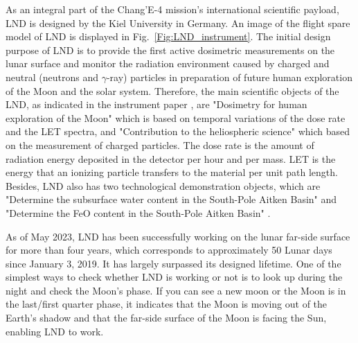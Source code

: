 As an integral part of the Chang'E-4 mission's international scientific payload, \acl{LND} is designed by the Kiel University in Germany. An image of the flight spare model of \ac{LND} is displayed in Fig.~\ref{Fig:LND_instrument}. 
The initial design purpose of \ac{LND} is to provide the first active 
dosimetric measurements on the lunar surface and monitor the radiation environment caused by charged and neutral (neutrons and $\gamma$-ray) particles in preparation of future human exploration of the Moon and the solar system. Therefore, the main scientific objects of the \ac{LND}, as indicated in the instrument paper \citep{Wimmer2020SSRv}, are "Dosimetry for human exploration of the Moon" which is based on temporal variations of the dose rate and the \ac{LET} spectra, and "Contribution to the heliospheric science" which based on the measurement of charged particles. The dose rate is the amount of radiation energy deposited in the detector per hour and per mass. \ac{LET} is the energy that an ionizing particle transfers to the material per unit path length.
Besides, \ac{LND} also has two technological demonstration objects, which are "Determine the subsurface water content in the South-Pole Aitken Basin" and "Determine the FeO content in the South-Pole Aitken Basin" \citep{Wimmer2020SSRv}.

As of May 2023, \ac{LND} has been successfully working on the lunar far-side surface for more than four years, which corresponds to approximately 50 Lunar days since January 3, 2019. It has largely surpassed its designed lifetime.
One of the simplest ways to check whether LND is working or not is to look up during the night and check the Moon's phase. If you can see a new moon or the Moon is in the last/first quarter phase, it indicates that the Moon is moving out of the Earth's shadow and that the far-side surface of the Moon is facing the Sun, enabling \ac{LND} to work.

